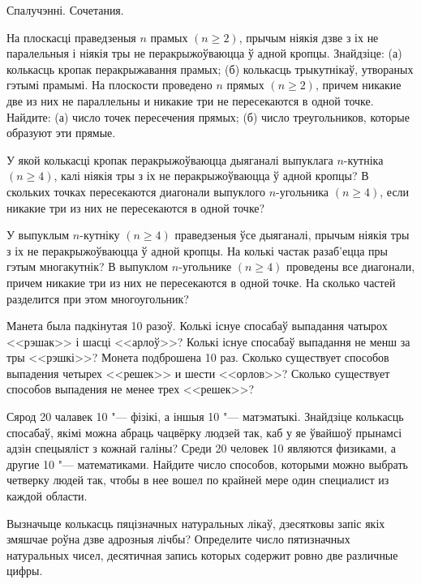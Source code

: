 \biLangHeader
{Спалучэнні.}
{Сочетания.}

\begin{problemList}

\problemItemSimple
{На плоскасці праведзеныя $n$ прамых $(n \ge 2)$, прычым ніякія дзве з іх не паралельныя
і ніякія тры не перакрыжоўваюцца ў адной кропцы. Знайдзіце: (а) колькасць кропак перакрыжавання прамых;
(б) колькасць трыкутнікаў, утвораных гэтымі прамымі.}
{На плоскости проведено $n$ прямых $(n \ge 2)$, причем никакие две из
них не параллельны и никакие три не пересекаются в одной точке.
Найдите: (а) число точек пересечения прямых; (б) число треугольников,
которые образуют эти прямые.}

\bigskip

\problemItemSimple
{У якой колькасці кропак перакрыжоўваюцца дыяганалі выпуклага $n$-кутніка
$(n \ge 4)$, калі ніякія тры з іх не перакрыжоўваюцца ў адной кропцы?}
{В скольких точках пересекаются диагонали выпуклого $n$-угольника
$(n \ge 4)$, если никакие три из них не пересекаются в одной точке?}

\bigskip

\problemItemSimple
{У выпуклым $n$-кутніку $(n \ge 4)$ праведзеныя ўсе дыяганалі, прычым
ніякія тры з іх не перакрыжоўваюцца ў адной кропцы. На колькі частак разаб'ецца
пры гэтым многакутнік?}
{В выпуклом $n$-угольнике $(n \ge 4)$ проведены все диагонали, причем
никакие три из них не пересекаются в одной точке. На сколько частей
разделится при этом многоугольник?}

\bigskip

\problemItemSimple
{Манета была падкінутая 10 разоў. Колькі існуе спосабаў выпадання чатырох
<<рэшак>> і шасці <<арлоў>>?
Колькі існуе спосабаў выпадання не менш за тры <<рэшкі>>?}
{Монета подброшена 10 раз. Сколько существует способов выпадения
четырех <<решек>> и шести <<орлов>>? Сколько существует способов выпадения
не менее трех <<решек>>?}

\bigskip

\problemItemSimple
{Сярод 20 чалавек 10 "--- фізікі, а іншыя 10 "--- матэматыкі. Знайдзіце колькасць спосабаў,
якімі можна абраць чацвёрку людзей так, каб у яе ўвайшоў прынамсі адзін спецыяліст з кожнай галіны?}
{Среди 20 человек 10 являются физиками, а другие 10 "--- математиками.
Найдите число способов, которыми можно выбрать четверку людей так,
чтобы в нее вошел по крайней мере один специалист из каждой области.}

\bigskip

\problemItemSimple
{Вызначыце колькасць пяцізначных натуральных лікаў, дзесятковы запіс якіх змяшчае роўна дзве адрозныя лічбы?}
{Определите число пятизначных натуральных чисел, десятичная запись
которых содержит ровно две различные цифры.}


\end{problemList}
